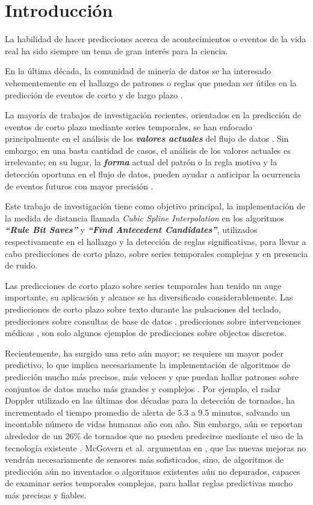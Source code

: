 \section{\textbf{Introducci\'on}}
La habilidad de hacer predicciones acerca de acontecimientos o eventos de la vida real ha sido siempre un tema de gran inter\'es para la ciencia.\par 
En la \'ultima d\'ecada, la comunidad de miner\'ia de datos se ha interesado vehementemente en el hallazgo de patrones o reglas que puedan ser \'utiles en la predicci\'on de eventos de corto y de largo plazo \cite{main}.\par
La mayor\'ia de trabajos de investigaci\'on recientes, orientados en la predicci\'on de eventos de corto plazo mediante series temporales, se han enfocado principalmente en el an\'alisis de los \textit{\textbf{valores actuales}} del flujo de datos \cite{rulediscovery}\cite{subsequencematching}. Sin embargo, en una basta cantidad de casos, el an\'alisis de los valores actuales es irrelevante; en su lugar, la \textit{\textbf{forma}} actual del patr\'on o la regla motivo y la detecci\'on oportuna en el flujo de datos, pueden ayudar a anticipar la ocurrencia de eventos futuros con mayor precisi\'on \cite{main}.\par
Este trabajo de investigaci\'on tiene como objetivo principal, la implementaci\'on de la medida de distancia llamada \textit{Cubic Spline Interpolation} en los algoritmos \textit{\textbf{\enquote{Rule Bit Saves}}} y \textit{\textbf{\enquote{Find Antecedent Candidates}}}, utilizados respectivamente en el hallazgo y la detecci\'on de reglas significativas, para llevar a cabo predicciones de corto plazo, sobre series temporales complejas y en presencia de ruido.\par
Las predicciones de corto plazo sobre series temporales han tenido un auge importante, su aplicaci\'on y alcance se ha diversificado considerablemente. Las predicciones de corto plazo sobre texto durante las pulsaciones del teclado, predicciones sobre consultas de base de datos \cite{type}, predicciones sobre intervenciones m\'edicas \cite{medical}, son solo algunos ejemplos de predicciones sobre objectos discretos.\par
Recientemente, ha surgido una reto a\'un mayor; se requiere un mayor poder predictivo, lo que implica necesariamente la implementaci\'on de algoritmos de predicci\'on mucho m\'as precisos, m\'as veloces y que puedan hallar patrones sobre conjuntos de datos mucho m\'as grandes y complejos \cite{robotics}. Por ejemplo, el radar Doppler utilizado en las \'ultimas dos d\'ecadas para la detecci\'on de tornados, ha incrementado el tiempo promedio de alerta de 5.3 a 9.5 minutos, salvando un incontable n\'umero de vidas humanas a\~no con a\~no. Sin embargo, a\'un se reportan alrededor de un 26\% de tornados que no pueden predecirse mediante el uso de la tecnolog\'ia existente \cite{weatherforcasting}. McGovern et al. argumentan en \cite{weatherprediction}, que las nuevas mejoras no vendr\'an necesariamente de sensores m\'as sofisticados, sino, de algoritmos de predicci\'on a\'un no inventados o algoritmos existentes a\'un no depurados, capaces de examinar series temporales complejas, para hallar reglas predictivas mucho m\'as precisas y fiables.\par
